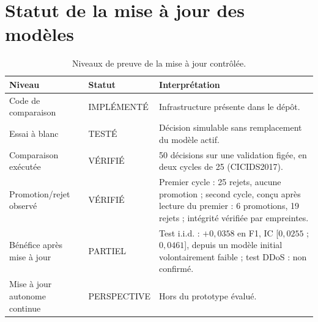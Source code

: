 \section{Statut de la mise à jour des modèles}

\begin{table}[H]
\centering
\caption{Niveaux de preuve de la mise à jour contrôlée.}
\label{tab:statut-model-update}
\begin{tabularx}{\textwidth}{p{} p{} X}
\toprule
\textbf{Niveau} & \textbf{Statut} & \textbf{Interprétation} \\
\midrule
Code de comparaison & IMPLÉMENTÉ & Infrastructure présente dans le dépôt. \\
Essai à blanc & TESTÉ & Décision simulable sans remplacement du modèle actif. \\
Comparaison exécutée & VÉRIFIÉ & 50 décisions sur une validation figée, en deux cycles de 25 (CICIDS2017). \\
Promotion/rejet observé & VÉRIFIÉ & Premier cycle : 25 rejets, aucune promotion ; second cycle, conçu après lecture du premier : 6 promotions, 19 rejets ; intégrité vérifiée par empreintes. \\
Bénéfice après mise à jour & PARTIEL & Test i.i.d. : $+0{,}0358$ en F1, IC [$0{,}0255$ ; $0{,}0461$], depuis un modèle initial volontairement faible ; test DDoS : non confirmé. \\
Mise à jour autonome continue & PERSPECTIVE & Hors du prototype évalué. \\
\bottomrule
\end{tabularx}
\end{table}

